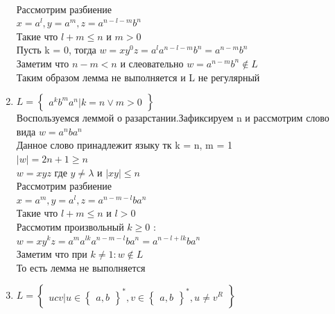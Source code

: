 \documentclass[a4paper]{article}
\begin{document}
\begin{enumerate}
\\ Рассмотрим разбиение
\\ $x = a^{l}, y = a^{m}, z = a^{n-l-m}b^{n}$
\\ Такие что $l + m \leq n$ и $m > 0$
\\ Пусть k = 0, тогда $w = xy^{0}z = a^{l}a^{n-l-m}b^{n} = a^{n-m}b^{n}$
\\ Заметим что $n-m < n$ и слеовательно $w = a^{n-m}b^{n} \notin L$
\\ Таким образом лемма не выполняется и L не регулярный
    \item $L = \begin{Bmatrix}
a^{k}b^{m}a^{n} | k = n \vee m > 0
\end{Bmatrix}$
\\ Воспользуемся леммой о разарстании.Зафиксируем n и рассмотрим слово вида $w = a^{n}ba^{n}$
\\ Данное слово принадлежит языку тк k = n, m = 1
\\ $|w| = 2n + 1 \geq n$
\\ $w = xyz$ где $y \ne \lambda$ и $|xy| \leq n$
\\ Рассмотрим разбиение 
\\ $x = a^{m}, y = a^{l}, z = a^{n-m-l}ba^{n}$
\\ Такие что $l + m \leq n$ и $l > 0$
\\ Рассмотим произвольный $k \geq 0$ :
\\ $w = xy^{k}z = a^{m}a^{lk}a^{n-m-l}ba^{n} = a^{n-l +lk}ba^{n}$
\\ Заметим что при $k \ne 1 : w \notin L$
\\ То есть лемма не выполняется 
    \item $L = \begin{Bmatrix}
ucv | u \in \begin{Bmatrix}
a, b
\end{Bmatrix}^{*}, v \in \begin{Bmatrix}
a, b
\end{Bmatrix}^{*}, u \neq v^{R}
\end{Bmatrix}$
\end{enumerate}
\end{document}
